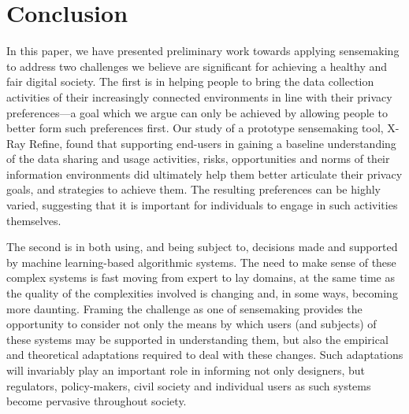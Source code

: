 \documentclass[sigchi-a, authorversion]{acmart}
\begin{document}



\section{Conclusion}

In this paper, we have presented preliminary work towards applying sensemaking to address two challenges we believe are significant for achieving a healthy and fair digital society. The first is in helping people to bring the data collection activities of their increasingly connected environments in line with their privacy preferences---a goal which we argue can only be achieved by allowing people to better form such preferences first.  Our study of a prototype sensemaking tool, X-Ray Refine, found that supporting end-users in gaining a baseline understanding of the data sharing and usage activities, risks, opportunities and norms of their information environments did ultimately help them better articulate their privacy goals, and strategies to achieve them.  The resulting preferences can be highly varied, suggesting that it is important for individuals to engage in such activities themselves. 

The second is in both using, and being subject to, decisions made and supported by machine learning-based algorithmic systems. The need to make sense of these complex systems is fast moving from expert to lay domains, at the same time as the quality of the complexities involved is changing and, in some ways, becoming more daunting. Framing the challenge as one of sensemaking provides the opportunity to consider not only the means by which users (and subjects) of these systems may be supported in understanding them, but also the empirical and theoretical adaptations required to deal with these changes. Such adaptations will invariably play an important role in informing not only designers, but regulators, policy-makers, civil society and individual users as such systems become pervasive throughout society.
\end{document}
